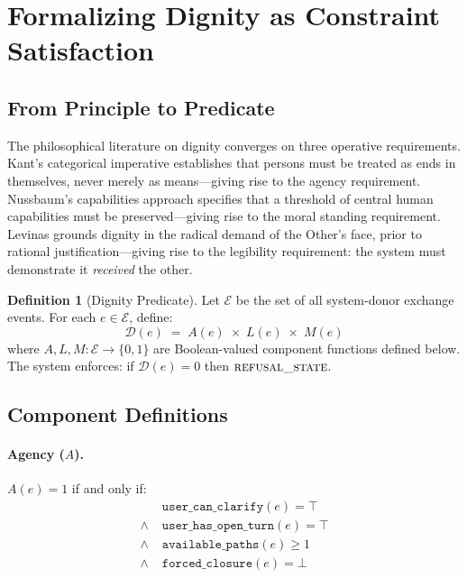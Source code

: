 \documentclass[12pt,a4paper]{article}
\theoremstyle{definition}
\newtheorem{definition}{Definition}[section]
\theoremstyle{remark}
\newcommand{\refusalstate}{\textsc{refusal\_state}}
\newcommand{\D}{\mathcal{D}}
\newcommand{\E}{\mathcal{E}}
\begin{document}
\section{Formalizing Dignity as Constraint Satisfaction}
\label{sec:dignity}

\subsection{From Principle to Predicate}

The philosophical literature on dignity converges on three operative requirements.
Kant's categorical imperative \cite{kant1785} establishes that persons must be treated
as ends in themselves, never merely as means—giving rise to the agency requirement.
Nussbaum's capabilities approach \cite{nussbaum2011} specifies that a threshold of
central human capabilities must be preserved—giving rise to the moral standing
requirement. Levinas \cite{levinas1969} grounds dignity in the radical demand of the
Other's face, prior to rational justification—giving rise to the legibility
requirement: the system must demonstrate it \emph{received} the other.

\begin{definition}[Dignity Predicate]
\label{def:dignity}
Let $\E$ be the set of all system-donor exchange events. For each $e \in \E$, define:
\begin{equation}
  \D(e) \;=\; A(e) \;\times\; L(e) \;\times\; M(e)
  \label{eq:dignity}
\end{equation}
where $A, L, M : \E \to \{0,1\}$ are Boolean-valued component functions defined below.
The system enforces: if $\D(e) = 0$ then $\refusalstate$.
\end{definition}

\subsection{Component Definitions}

\paragraph{Agency ($A$).}
$A(e) = 1$ if and only if:
\begin{align*}
  &\texttt{user\_can\_clarify}(e) = \top \\
  \wedge\; &\texttt{user\_has\_open\_turn}(e) = \top \\
  \wedge\; &\texttt{available\_paths}(e) \geq 1 \\
  \wedge\; &\texttt{forced\_closure}(e) = \bot
\end{align*}
\end{document}
